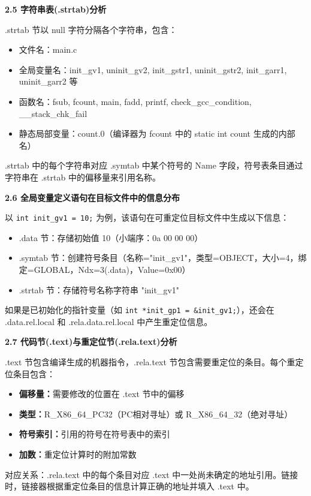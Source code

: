 \documentclass[12pt,a4paper]{ctexart}
\begin{document}
\textbf{2.5 字符串表(.strtab)分析}

.strtab 节以 null 字符分隔各个字符串，包含：
\begin{itemize}[nosep]
    \item 文件名：main.c
    \item 全局变量名：init\_gv1, uninit\_gv2, init\_gstr1, uninit\_gstr2, init\_garr1, uninit\_garr2 等
    \item 函数名：fsub, fcount, main, fadd, printf, check\_gcc\_condition, \_\_stack\_chk\_fail
    \item 静态局部变量：count.0（编译器为 fcount 中的 static int count 生成的内部名）
\end{itemize}

.strtab 中的每个字符串对应 .symtab 中某个符号的 Name 字段，符号表条目通过字符串在 .strtab 中的偏移量来引用名称。

\textbf{2.6 全局变量定义语句在目标文件中的信息分布}

以 \texttt{int init\_gv1 = 10;} 为例，该语句在可重定位目标文件中生成以下信息：
\begin{itemize}[nosep]
    \item .data 节：存储初始值 10（小端序：0a 00 00 00）
    \item .symtab 节：创建符号条目（名称="init\_gv1"，类型=OBJECT，大小=4，绑定=GLOBAL，Ndx=3(.data)，Value=0x00）
    \item .strtab 节：存储符号名称字符串 "init\_gv1"
\end{itemize}

如果是已初始化的指针变量（如 \texttt{int *init\_gp1 = \&init\_gv1;}），还会在 .data.rel.local 和 .rela.data.rel.local 中产生重定位信息。

\textbf{2.7 代码节(.text)与重定位节(.rela.text)分析}

.text 节包含编译生成的机器指令，.rela.text 节包含需要重定位的条目。每个重定位条目包含：
\begin{itemize}[nosep]
    \item \textbf{偏移量：}需要修改的位置在 .text 节中的偏移
    \item \textbf{类型：}R\_X86\_64\_PC32（PC相对寻址）或 R\_X86\_64\_32（绝对寻址）
    \item \textbf{符号索引：}引用的符号在符号表中的索引
    \item \textbf{加数：}重定位计算时的附加常数
\end{itemize}

对应关系：.rela.text 中的每个条目对应 .text 中一处尚未确定的地址引用。链接时，链接器根据重定位条目的信息计算正确的地址并填入 .text 中。
\end{document}

